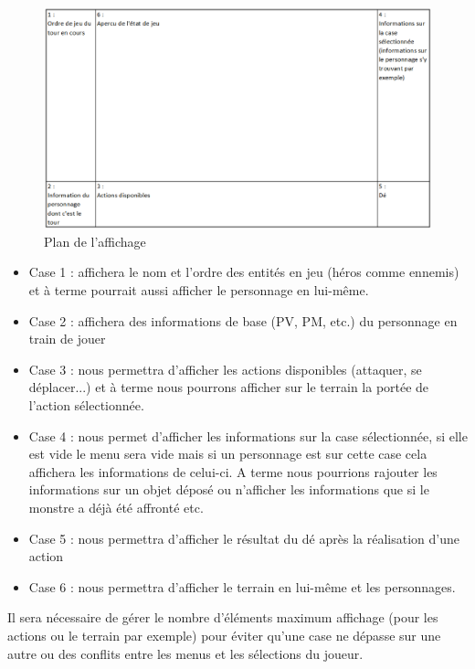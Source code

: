 \documentclass[a4paper,12pt]{article}
\begin{document}
\begin{figure}[hbt!]
    \centering
    \includegraphics[scale=0.7, angle=0]{images/plan.png}
    \caption{Plan de l'affichage}
    \label{fig:plan}
\end{figure}

\begin{itemize}
    \item Case 1 : affichera le nom et l'ordre des entités en jeu (héros comme ennemis) et à terme pourrait aussi afficher le personnage en lui-même.
    \item Case 2 : affichera des informations de base (PV, PM, etc.) du personnage en train de jouer
    \item Case 3 : nous permettra d'afficher les actions disponibles (attaquer, se déplacer...) et à terme nous pourrons afficher sur le terrain la portée de l'action sélectionnée. 
    \item Case 4 : nous permet d'afficher les informations sur la case sélectionnée, si elle est vide le menu sera vide mais si un personnage est sur cette case cela affichera les informations de celui-ci. A terme nous pourrions rajouter les informations sur un objet déposé ou n'afficher les informations que si le monstre a déjà été affronté etc.
    \item Case 5 : nous permettra d'afficher le résultat du dé après la réalisation d'une action
    \item Case 6 : nous permettra d'afficher le terrain en lui-même et les personnages.
\end{itemize}

Il sera nécessaire de gérer le nombre d'éléments maximum affichage (pour les actions ou le terrain par exemple) pour éviter qu'une case ne dépasse sur une autre ou des conflits entre les menus et les sélections du joueur.
\end{document}
